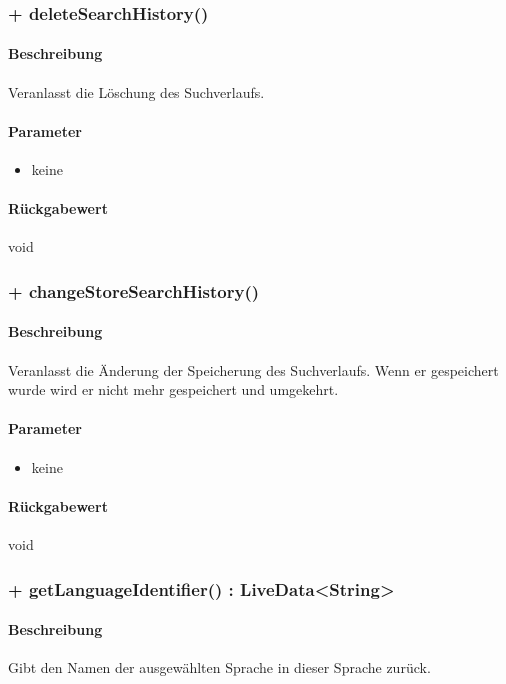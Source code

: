\subsubsection{+ deleteSearchHistory()}%
\paragraph*{Beschreibung}
Veranlasst die Löschung des Suchverlaufs.
\paragraph*{Parameter}
\begin{itemize}
    \item keine
\end{itemize}
\paragraph*{Rückgabewert}
void

\subsubsection{+ changeStoreSearchHistory()}%
\paragraph*{Beschreibung}
Veranlasst die Änderung der Speicherung des Suchverlaufs. 
Wenn er gespeichert wurde wird er nicht mehr gespeichert und umgekehrt.
\paragraph*{Parameter}
\begin{itemize}
    \item keine
\end{itemize}
\paragraph*{Rückgabewert}
void

\subsubsection{+ getLanguageIdentifier() : LiveData<String>}%
\paragraph*{Beschreibung}
Gibt den Namen der ausgewählten Sprache in dieser Sprache zurück.

